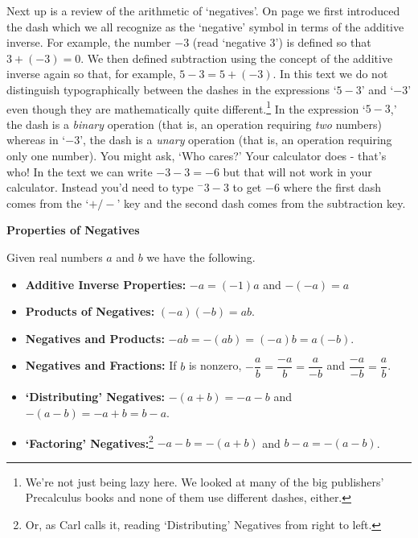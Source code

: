 Next up is a review of the arithmetic of `negatives'. On page \pageref{realnumberaddition} we first introduced the dash which we all recognize as the `negative' symbol in terms of the additive inverse.  For example, the number $-3$ (read `negative $3$') is defined so that $3 + (-3) = 0$.  We then defined subtraction using the concept of the additive inverse again so that, for example, $5 - 3 = 5 + (-3)$.  In this text we do not distinguish typographically between the dashes in the expressions `$5-3$' and `$-3$' even though they are mathematically quite different.\footnote{We're not just being lazy here.  We looked at many of the big publishers' Precalculus books and none of them use different dashes, either.} In the expression `$5-3$,' the dash is a \textit{binary} operation (that is, an operation requiring \textit{two} numbers) whereas in `$-3$', the dash is a \textit{unary} operation (that is, an operation requiring only one number).  You might ask, `Who cares?'  Your calculator does - that's who!  In the text we can write $-3 - 3 = -6$ but that will not work in your calculator.  Instead you'd need to type $^{-}3 - 3$ to get $-6$ where the first dash comes from the `$+/-$' key and the second dash comes from the subtraction key.

\medskip

\label{propertiesofnegatives}

 \colorbox{ResultColor}{\bbm

\centerline{\textbf{Properties of Negatives}}
\smallskip
Given real numbers $a$ and $b$ we have the following.  

\begin{itemize}

\item  \textbf{Additive Inverse Properties:}  $-a = (-1)a$ and $-(-a) = a$

\item  \textbf{Products of Negatives:} $(-a)(-b) = ab$. 

\item  \textbf{Negatives and Products:} $-ab = -(ab) = (-a)b = a(-b)$.

\item  \textbf{Negatives and Fractions:} If $b$ is nonzero, $-\dfrac{a}{b} = \dfrac{-a}{b} = \dfrac{a}{-b}$ and $\dfrac{-a}{-b} = \dfrac{a}{b}$.

\item  \textbf{`Distributing' Negatives:}  $-(a+b) = -a-b$ and $-(a-b) = -a + b = b-a$.

\item  \textbf{`Factoring' Negatives:}\footnote{Or, as Carl calls it, reading `Distributing' Negatives from right to left.} $-a-b = -(a+b)$ and $b-a = -(a-b)$.

\end{itemize}

\ebm}

